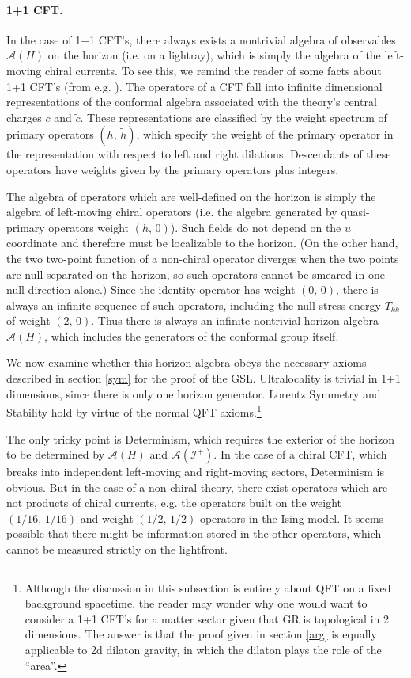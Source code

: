 \documentclass[12pt]{article}
\begin{document}
\paragraph{\textbf{1+1 CFT}.} In the case of 1+1 CFT's, there always exists a nontrivial algebra of observables $\mathcal{A}(H)$ on the horizon (i.e. on a lightray), which is simply the algebra of the left-moving chiral currents.  To see this, we remind the reader of some facts about 1+1 CFT's (from e.g. \cite{ginsparg89}).  The operators of a CFT fall into infinite dimensional representations of the conformal algebra associated with the theory's central charges $c$ and $\tilde{c}$.  These representations are classified by the weight spectrum of primary operators $(h,\,\tilde{h})$, which specify the weight of the primary operator in the representation with respect to left and right dilations.  Descendants of these operators have weights given by the primary operators plus integers.

The algebra of operators which are well-defined on the horizon is simply the algebra of left-moving chiral operators (i.e. the algebra generated by quasi-primary operators weight $(h,\,0)$).  Such fields do not depend on the $u$ coordinate and therefore must be localizable to the horizon.  (On the other hand, the two two-point function of a non-chiral operator diverges when the two points are null separated on the horizon, so such operators cannot be smeared in one null direction alone.)  Since the identity operator has weight $(0,\,0)$, there is always an infinite sequence of such operators, including the null stress-energy $T_{kk}$ of weight $(2,\,0)$.  Thus there is always an infinite nontrivial horizon algebra $\mathcal{A}(H)$, which includes the generators of the conformal group itself.

We now examine whether this horizon algebra obeys the necessary axioms described in section \ref{sym} for the proof of the GSL.  Ultralocality is trivial in 1+1 dimensions, since there is only one horizon generator.  Lorentz Symmetry and Stability hold by virtue of the normal QFT axioms.\footnote{Although the discussion in this subsection is entirely about QFT on a fixed background spacetime, the reader may wonder why one would want to consider a 1+1 CFT's for a matter sector given that GR is topological in 2 dimensions.  The answer is that the proof given in section \ref{arg} is equally applicable to 2d dilaton gravity, in which the dilaton plays the role of the  ``area''.}

The only tricky point is Determinism, which requires the exterior of the horizon to be determined by $\mathcal{A}(H)$ and $\mathcal{A}(\mathcal{I}^+)$.  In the case of a chiral CFT, which breaks into independent left-moving and right-moving sectors, Determinism is obvious.  But in the case of a non-chiral theory, there exist operators which are not products of chiral currents, e.g. the operators built on the weight $(1/16,\,1/16)$ and weight $(1/2,\,1/2)$ operators in the Ising model.  It seems possible that there might be information stored in the other operators, which cannot be measured strictly on the lightfront.
\end{document}
